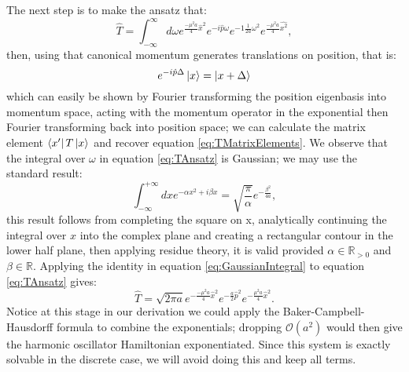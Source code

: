 \documentclass[12pt]{article}
\begin{document}
        The next step is to make the ansatz that:
        \begin{equation}
            \label{eq:TAnsatz}
            \hat{T} = \int_{-\infty}^{\infty} d\omega e^{\frac{-\mu^2a}{4}\hat{x}^2}e^{-i\hat{p}\omega}e^{-1\frac{1}{2a}\omega^2}e^{\frac{-\mu^2a}{4}\hat{x^2}},
        \end{equation}
        then, using that canonical momentum generates translations on position, that is:
        \begin{equation}
            \label{eq:MomentumTranslation}
            e^{-i\hat{p}\Delta}\ket{x} = \ket{x+\Delta}
        \end{equation}
        which can easily be shown by Fourier transforming the position eigenbasis into momentum space, acting with the momentum operator in the exponential then Fourier transforming back into position space; we can calculate the matrix element $\bra{x'}T\ket{x}$ and recover equation \ref{eq:TMatrixElements}. We observe that the integral over $\omega$ in equation \ref{eq:TAnsatz} is Gaussian; we may use the standard result:
        \begin{equation}
            \label{eq:GaussianIntegral}
            \int_{-\infty}^{+\infty}dx e^{-\alpha x^2 + i\beta x} = \sqrt{\frac{\pi}{\alpha}}e^{-\frac{\beta^2}{4a}},
        \end{equation}
        this result follows from completing the square on x, analytically continuing the integral over $x$ into the complex plane and creating a rectangular contour in the lower half plane, then applying residue theory, it is valid provided $\alpha \in \mathbb{R}_{>0}$ and $\beta \in \mathbb{R}$. Applying the identity in equation \ref{eq:GaussianIntegral} to equation \ref{eq:TAnsatz} gives:
        \begin{equation}
            \label{eq:TClosedForm}
            \hat{T} = \sqrt{2\pi a} e^{-\frac{-\mu^2a}{4}\hat{x}^2}e^{-\frac{a}{2}\hat{p}^2}e^{-\frac{\mu^2a}{4}\hat{x}^2}.
        \end{equation}
        Notice at this stage in our derivation we could apply the Baker-Campbell-Hausdorff formula to combine the exponentials; dropping $\mathcal{O}\left(a^2\right)$ would then give the harmonic oscillator Hamiltonian exponentiated. Since this system is exactly solvable in the discrete case, we will avoid doing this and keep all terms. 
\end{document}
